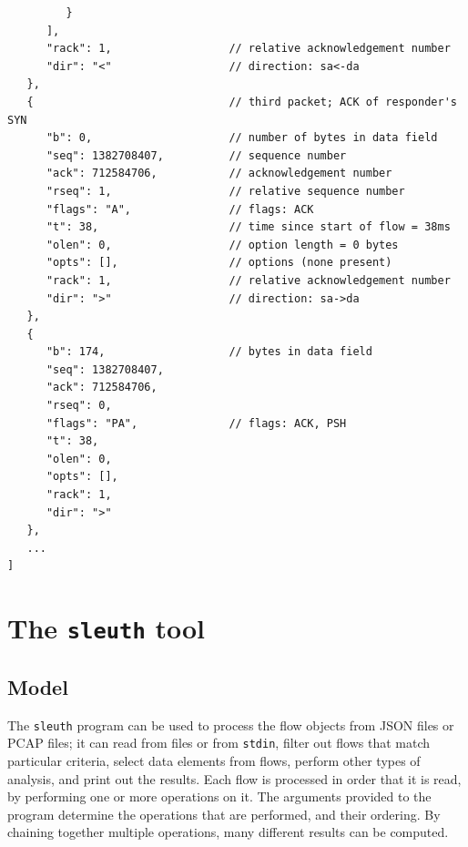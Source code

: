 \documentclass{book}
\begin{document}
\begin{mdframed}[style=cli]
\begin{verbatim}
         }
      ], 
      "rack": 1,                  // relative acknowledgement number
      "dir": "<"                  // direction: sa<-da
   }, 
   {                              // third packet; ACK of responder's SYN
      "b": 0,                     // number of bytes in data field
      "seq": 1382708407,          // sequence number
      "ack": 712584706,           // acknowledgement number
      "rseq": 1,                  // relative sequence number
      "flags": "A",               // flags: ACK
      "t": 38,                    // time since start of flow = 38ms
      "olen": 0,                  // option length = 0 bytes
      "opts": [],                 // options (none present) 
      "rack": 1,                  // relative acknowledgement number
      "dir": ">"                  // direction: sa->da
   }, 
   {
      "b": 174,                   // bytes in data field
      "seq": 1382708407,          
      "ack": 712584706, 
      "rseq": 0, 
      "flags": "PA",              // flags: ACK, PSH
      "t": 38, 
      "olen": 0, 
      "opts": [], 
      "rack": 1, 
      "dir": ">"
   }, 
   ...
] 
\end{verbatim}
\end{mdframed}



\chapter{The \texttt{sleuth} tool}
\label{querytool}

\section{Model}
The \texttt{sleuth} program can be used to process the flow objects from JSON
files or PCAP files; it can read from files or from \texttt{stdin},
filter out flows that match particular criteria, select data elements
from flows, perform other types of analysis, and print out the
results.  Each flow is processed in order that it is read, by
performing one or more operations on it.  The arguments provided to
the program determine the operations that are performed, and their
ordering.  By chaining together multiple operations, many different
results can be computed.


%
\end{document}
